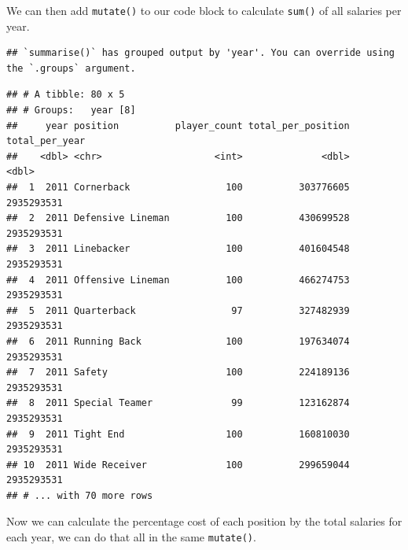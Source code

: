\documentclass[
]{book}
\newenvironment{Shaded}{\begin{snugshade}}{\end{snugshade}}
\newcommand{\DataTypeTok}[1]{\textcolor[rgb]{0.13,0.29,0.53}{#1}}
\newcommand{\KeywordTok}[1]{\textcolor[rgb]{0.13,0.29,0.53}{\textbf{#1}}}
\newcommand{\NormalTok}[1]{#1}
\newcommand{\OperatorTok}[1]{\textcolor[rgb]{0.81,0.36,0.00}{\textbf{#1}}}
\newcommand{\StringTok}[1]{\textcolor[rgb]{0.31,0.60,0.02}{#1}}
\begin{document}
We can then add \texttt{mutate()} to our code block to calculate \texttt{sum()} of all salaries per year.

\begin{Shaded}
\end{Shaded}

\begin{verbatim}
## `summarise()` has grouped output by 'year'. You can override using the `.groups` argument.
\end{verbatim}

\begin{verbatim}
## # A tibble: 80 x 5
## # Groups:   year [8]
##     year position          player_count total_per_position total_per_year
##    <dbl> <chr>                    <int>              <dbl>          <dbl>
##  1  2011 Cornerback                 100          303776605     2935293531
##  2  2011 Defensive Lineman          100          430699528     2935293531
##  3  2011 Linebacker                 100          401604548     2935293531
##  4  2011 Offensive Lineman          100          466274753     2935293531
##  5  2011 Quarterback                 97          327482939     2935293531
##  6  2011 Running Back               100          197634074     2935293531
##  7  2011 Safety                     100          224189136     2935293531
##  8  2011 Special Teamer              99          123162874     2935293531
##  9  2011 Tight End                  100          160810030     2935293531
## 10  2011 Wide Receiver              100          299659044     2935293531
## # ... with 70 more rows
\end{verbatim}

Now we can calculate the percentage cost of each position by the total salaries for each year, we can do that all in the same \texttt{mutate()}.

\begin{Shaded}
\end{Shaded}
\end{document}
